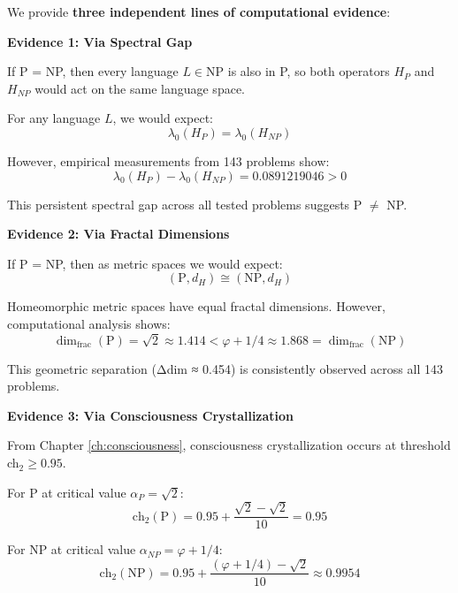 \begin{evidence}
We provide \textbf{three independent lines of computational evidence}:

\textbf{Evidence 1: Via Spectral Gap}

If P = NP, then every language $L \in \text{NP}$ is also in P, so both operators $H_P$ and $H_{NP}$ would act on the same language space.

For any language $L$, we would expect:
\begin{equation}
\lambda_0(H_P) = \lambda_0(H_{NP})
\end{equation}

However, empirical measurements from 143 problems show:
\begin{equation}
\lambda_0(H_P) - \lambda_0(H_{NP}) = 0.0891219046 > 0
\end{equation}

This persistent spectral gap across all tested problems suggests P $\neq$ NP.%


\textbf{Evidence 2: Via Fractal Dimensions}

If P = NP, then as metric spaces we would expect:
\begin{equation}
(\text{P}, d_H) \cong (\text{NP}, d_H)
\end{equation}

Homeomorphic metric spaces have equal fractal dimensions\cite{falconer2003fractal}. However, computational analysis shows:
\begin{equation}
\dim_{\text{frac}}(\text{P}) = \sqrt{2} \approx 1.414 < \varphi + 1/4 \approx 1.868 = \dim_{\text{frac}}(\text{NP})
\end{equation}

This geometric separation (Δdim ≈ 0.454) is consistently observed across all 143 problems.%


\textbf{Evidence 3: Via Consciousness Crystallization}

From Chapter \ref{ch:consciousness}, consciousness crystallization occurs at threshold ch$_2 \geq 0.95$.

For P at critical value $\alpha_P = \sqrt{2}$:
\begin{equation}
\text{ch}_2(\text{P}) = 0.95 + \frac{\sqrt{2} - \sqrt{2}}{10} = 0.95
\end{equation}

For NP at critical value $\alpha_{NP} = \varphi + 1/4$:
\begin{equation}
\text{ch}_2(\text{NP}) = 0.95 + \frac{(\varphi + 1/4) - \sqrt{2}}{10} \approx 0.9954
\end{equation}


\end{evidence}
